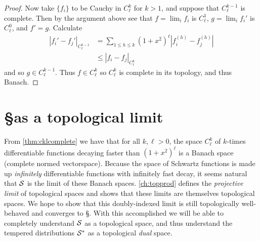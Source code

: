 \begin{proof}
        Now take $\{f_i\}$ to be Cauchy in $C^k_\ell$ for $k>1$, and suppose that $C^{k-1}_\ell$ is complete.
        Then by the argument above see that $f=\lim_i f_i$ is $C^1_\ell$, $g=\lim_i f_i'$ is $C^0_\ell$, and $f'=g$.
        Calculate
        \begin{align*}
          |f_i'-f_j'|_{C^{k-1}_\ell}
          &= \sum_{1\le h\le k} (1+x^2)^\ell\left|f_i^{(h)}-f_j^{(h)}\right|
          \\&\le |f_i-f_j|_{C^k_\ell}
        \end{align*}
        and so $g\in C^{k-1}_\ell$.
        Thus $f\in C^k_\ell$ so $C^k_\ell$ is complete in its topology, and thus Banach.
      \end{proof}

    \section{\S as a topological limit}
      
      From \cref{thm:cklcomplete} we have that for all $k,\ell>0$, the space $C^k_\ell$ of $k$-times differentiable functions decaying faster than $(1+x^2)^\ell$ is a Banach space (complete normed vectorspace).
      Because the space of Schwartz functions is made up \emph{infinitely} differentiable functions with infinitely fast decay, it seems natural that $\S$ is the limit of these Banach spaces.
      \cref{ch:topprod} defines the \emph{projective limit} of topological spaces and shows that these limits are themselves topological spaces.
      We hope to show that this doubly-indexed limit is still topologically well-behaved and converges to \S.
      With this accomplished we will be able to completely understand $\S$ as a topological space, and thus understand the tempered distributions $\S^*$ as a topological \emph{dual} space.

